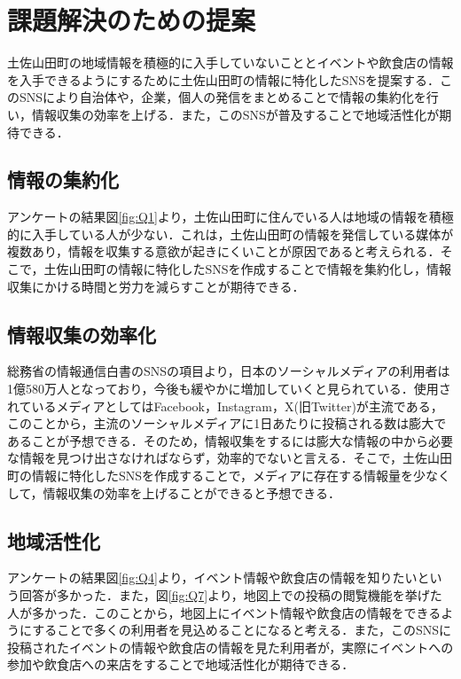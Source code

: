 \section{課題解決のための提案}
土佐山田町の地域情報を積極的に入手していないこととイベントや飲食店の情報を入手できるようにするために土佐山田町の情報に特化したSNSを提案する．このSNSにより自治体や，企業，個人の発信をまとめることで情報の集約化を行い，情報収集の効率を上げる．また，このSNSが普及することで地域活性化が期待できる．

\subsection{情報の集約化}
アンケートの結果図\ref{fig:Q1}より，土佐山田町に住んでいる人は地域の情報を積極的に入手している人が少ない．これは，土佐山田町の情報を発信している媒体が複数あり，情報を収集する意欲が起きにくいことが原因であると考えられる．そこで，土佐山田町の情報に特化したSNSを作成することで情報を集約化し，情報収集にかける時間と労力を減らすことが期待できる．

\subsection{情報収集の効率化}
総務省の情報通信白書のSNSの項目より，日本のソーシャルメディアの利用者は1億580万人となっており，今後も緩やかに増加していくと見られている．使用されているメディアとしてはFacebook，Instagram，X(旧Twitter)が主流である，このことから，主流のソーシャルメディアに1日あたりに投稿される数は膨大であることが予想できる．そのため，情報収集をするには膨大な情報の中から必要な情報を見つけ出さなければならず，効率的でないと言える．そこで，土佐山田町の情報に特化したSNSを作成することで，メディアに存在する情報量を少なくして，情報収集の効率を上げることができると予想できる．

\subsection{地域活性化}
アンケートの結果図\ref{fig:Q4}より，イベント情報や飲食店の情報を知りたいという回答が多かった．また，図\ref{fig:Q7}より，地図上での投稿の閲覧機能を挙げた人が多かった．このことから，地図上にイベント情報や飲食店の情報をできるようにすることで多くの利用者を見込めることになると考える．また，このSNSに投稿されたイベントの情報や飲食店の情報を見た利用者が，実際にイベントへの参加や飲食店への来店をすることで地域活性化が期待できる．